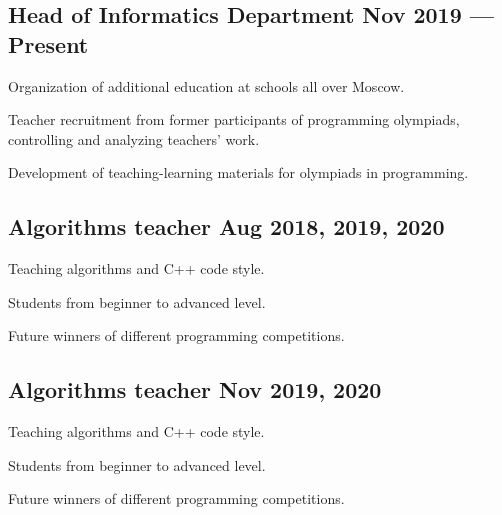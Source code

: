 
\subsection{{Head of Informatics Department \hfill Nov 2019 --- Present}}
\begin{zitemize}
\item Organization of additional education at schools all over Moscow.
\item Teacher recruitment from former participants of programming olympiads, controlling and analyzing teachers' work.
\item Development of teaching-learning materials for olympiads in programming.
\end{zitemize}

\subsection{{Algorithms teacher \hfill Aug 2018, 2019, 2020}}
\begin{zitemize}
\item Teaching algorithms and C++ code style.
\item Students from beginner to advanced level.
\item Future winners of different programming competitions.
\end{zitemize}

\subsection{{Algorithms teacher \hfill Nov 2019, 2020}}
\begin{zitemize}
\item Teaching algorithms and C++ code style.
\item Students from beginner to advanced level.
\item Future winners of different programming competitions.
\end{zitemize}
